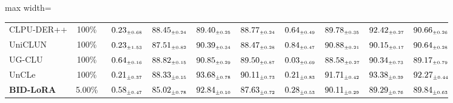 \begin{table}[!htbp]
\begin{adjustbox}{max width=\textwidth}
\begin{tabular}{l|c|cccc|cccc}
CLPU-DER++ & 100\% & $\kern6pt0.23_{\scriptscriptstyle \pm 0.68}\kern-6pt$ & $\kern6pt88.45_{\scriptscriptstyle \pm 0.24}\kern-6pt$ & $\kern6pt89.40_{\scriptscriptstyle \pm 0.25}\kern-6pt$ & $\kern6pt88.77_{\scriptscriptstyle \pm 0.24}\kern-6pt$ & $\kern6pt0.64_{\scriptscriptstyle \pm 0.49}\kern-6pt$ & $\kern6pt89.78_{\scriptscriptstyle \pm 0.35}\kern-6pt$ & $\kern6pt92.42_{\scriptscriptstyle \pm 0.27}\kern-6pt$ & \colorbox{yellow!35}{$\kern6pt90.66_{\scriptscriptstyle \pm 0.26}\kern-6pt$} \\
UniCLUN & 100\% & $\kern6pt0.23_{\scriptscriptstyle \pm 1.53}\kern-6pt$ & $\kern6pt87.51_{\scriptscriptstyle \pm 0.82}\kern-6pt$ & $\kern6pt90.39_{\scriptscriptstyle \pm 0.34}\kern-6pt$ & $\kern6pt88.47_{\scriptscriptstyle \pm 0.28}\kern-6pt$ & $\kern6pt0.84_{\scriptscriptstyle \pm 0.47}\kern-6pt$ & \colorbox{yellow!35}{$\kern6pt90.88_{\scriptscriptstyle \pm 0.21}\kern-6pt$} & $\kern6pt90.15_{\scriptscriptstyle \pm 0.17}\kern-6pt$ & $\kern6pt90.64_{\scriptscriptstyle \pm 0.28}\kern-6pt$ \\
UG-CLU & 100\% & $\kern6pt0.64_{\scriptscriptstyle \pm 0.16}\kern-6pt$ & \colorbox{yellow!35}{$\kern6pt88.82_{\scriptscriptstyle \pm 0.15}\kern-6pt$} & $\kern6pt90.85_{\scriptscriptstyle \pm 0.29}\kern-6pt$ & $\kern6pt89.50_{\scriptscriptstyle \pm 0.87}\kern-6pt$ & $\kern6pt0.03_{\scriptscriptstyle \pm 0.69}\kern-6pt$ & $\kern6pt88.58_{\scriptscriptstyle \pm 0.27}\kern-6pt$ & $\kern6pt90.34_{\scriptscriptstyle \pm 0.73}\kern-6pt$ & $\kern6pt89.17_{\scriptscriptstyle \pm 0.79}\kern-6pt$ \\
UnCLe & 100\% & $\kern6pt0.21_{\scriptscriptstyle \pm 0.37}\kern-6pt$ & $\kern6pt88.33_{\scriptscriptstyle \pm 0.15}\kern-6pt$ & \colorbox{green!25}{$\kern6pt93.68_{\scriptscriptstyle \pm 0.78}\kern-6pt$} & \colorbox{green!25}{$\kern6pt90.11_{\scriptscriptstyle \pm 0.73}\kern-6pt$} & $\kern6pt0.21_{\scriptscriptstyle \pm 0.83}\kern-6pt$ & \colorbox{green!25}{$\kern6pt91.71_{\scriptscriptstyle \pm 0.42}\kern-6pt$} & \colorbox{yellow!35}{$\kern6pt93.38_{\scriptscriptstyle \pm 0.39}\kern-6pt$} & \colorbox{green!25}{$\kern6pt92.27_{\scriptscriptstyle \pm 0.44}\kern-6pt$} \\
\midrule
\rowcolor{pink!15}
\textbf{BID-LoRA} & 5.00\% & $\kern6pt0.58_{\scriptscriptstyle \pm 0.47}\kern-6pt$ & $\kern6pt85.02_{\scriptscriptstyle \pm 0.78}\kern-6pt$ & \colorbox{yellow!35}{$\kern6pt92.84_{\scriptscriptstyle \pm 0.10}\kern-6pt$} & $\kern6pt87.63_{\scriptscriptstyle \pm 0.72}\kern-6pt$ & $\kern6pt0.28_{\scriptscriptstyle \pm 0.53}\kern-6pt$ & $\kern6pt90.11_{\scriptscriptstyle \pm 0.29}\kern-6pt$ & $\kern6pt89.29_{\scriptscriptstyle \pm 0.76}\kern-6pt$ & $\kern6pt89.84_{\scriptscriptstyle \pm 0.63}\kern-6pt$ \\

\end{tabular}
\end{adjustbox}
\end{table}
